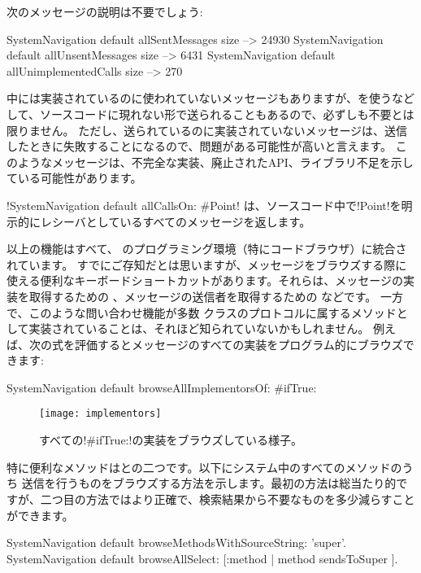 \documentclass[a4paper,10pt,twoside]{book}
\begin{document}
次のメッセージの説明は不要でしょう:

\begin{code}{}
SystemNavigation default allSentMessages size          --> 24930
SystemNavigation default allUnsentMessages size      --> 6431
SystemNavigation default allUnimplementedCalls size --> 270
\end{code}

中には実装されているのに使われていないメッセージもありますが、を使うなどして、ソースコードに現れない形で送られることもあるので、必ずしも不要とは限りません。
ただし、送られているのに実装されていないメッセージは、送信したときに失敗することになるので、問題がある可能性が高いと言えます。
このようなメッセージは、不完全な実装、廃止されたAPI、ライブラリ不足を示している可能性があります。

\ct!SystemNavigation default allCallsOn: #Point! は、ソースコード中で\ct!Point!を明示的にレシーバとしているすべてのメッセージを返します。

以上の機能はすべて、 \pharo のプログラミング環境（特にコードブラウザ）に統合されています。
すでにご存知だとは思いますが、メッセージをブラウズする際に使える便利なキーボードショートカットがあります。それらは、メッセージの実装を取得するための  、メッセージの送信者を取得するための  などです。
一方で、このような問い合わせ機能が多数 クラスのプロトコルに属するメソッドとして実装されていることは、それほど知られていないかもしれません。
例えば、次の式を評価するとメッセージのすべての実装をプログラム的にブラウズできます:
\begin{code}{}
SystemNavigation default browseAllImplementorsOf: #ifTrue:
\end{code}

\begin{figure}[ht]\centering
	\texttt{[image: implementors]}
	\caption{すべての\ct!\#ifTrue:!の実装をブラウズしている様子。}
\end{figure}

特に便利なメソッドはとの二つです。以下にシステム中のすべてのメソッドのうち \super 送信を行うものをブラウズする方法を示します。最初の方法は総当たり的ですが、二つ目の方法ではより正確で、検索結果から不要なものを多少減らすことができます。
\begin{code}{}
SystemNavigation default browseMethodsWithSourceString: 'super'.
SystemNavigation default browseAllSelect: [:method | method sendsToSuper ].
\end{code}
\end{document}
